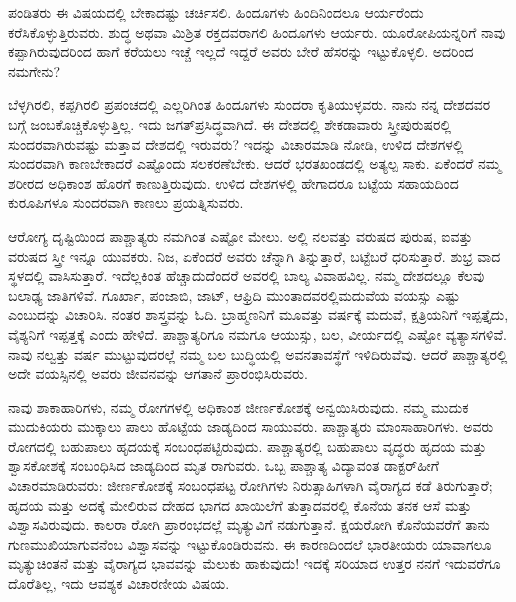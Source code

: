 ಪಂಡಿತರು ಈ ವಿಷಯದಲ್ಲಿ ಬೇಕಾದಷ್ಟು ಚರ್ಚಿಸಲಿ. ಹಿಂದೂಗಳು ಹಿಂದಿನಿಂದಲೂ ಆರ್ಯರೆಂದು ಕರೆಸಿಕೊಳ್ಳುತ್ತಿರುವರು. ಶುದ್ಧ ಅಥವಾ ಮಿಶ್ರಿತ ರಕ್ತದವರಾಗಲಿ ಹಿಂದೂಗಳು ಆರ್ಯರು. ಯೂರೋಪಿಯನ್ನರಿಗೆ ನಾವು ಕಪ್ಪಾಗಿರುವುದರಿಂದ ಹಾಗೆ ಕರೆಯಲು ಇಚ್ಚೆ ಇಲ್ಲದೆ ಇದ್ದರೆ ಅವರು ಬೇರೆ ಹೆಸರನ್ನು ಇಟ್ಟುಕೊಳ್ಳಲಿ. ಅದರಿಂದ ನಮಗೇನು?

ಬೆಳ್ಳಗಿರಲಿ, ಕಪ್ಪಗಿರಲಿ ಪ್ರಪಂಚದಲ್ಲಿ ಎಲ್ಲರಿಗಿಂತ ಹಿಂದೂಗಳು ಸುಂದರಾ ಕೃತಿಯುಳ್ಳ\break ವರು. ನಾನು ನನ್ನ ದೇಶದವರ ಬಗ್ಗೆ ಜಂಬಕೊಚ್ಚಿಕೊಳ್ಳುತ್ತಿಲ್ಲ. ಇದು ಜಗತ್​ಪ್ರಸಿದ್ಧವಾಗಿದೆ. ಈ ದೇಶದಲ್ಲಿ ಶೇಕಡಾವಾರು ಸ್ತ್ರೀಪುರುಷರಲ್ಲಿ ಸುಂದರವಾಗಿರುವಷ್ಟು ಮತ್ತಾವ ದೇಶದಲ್ಲಿ ಇರುವರು? ಇದನ್ನು ವಿಚಾರಮಾಡಿ ನೋಡಿ, ಉಳಿದ ದೇಶಗಳಲ್ಲಿ ಸುಂದರವಾಗಿ ಕಾಣಬೇಕಾದರೆ ಎಷ್ಟೊಂದು ಸಲಕರಣೆಬೇಕು. ಆದರೆ ಭರತಖಂಡದಲ್ಲಿ ಅತ್ಯಲ್ಪ ಸಾಕು. ಏಕೆಂದರೆ ನಮ್ಮ ಶರೀರದ ಅಧಿಕಾಂಶ ಹೊರಗೆ ಕಾಣುತ್ತಿರುವುದು. ಉಳಿದ ದೇಶಗಳಲ್ಲಿ ಹೇಗಾದರೂ ಬಟ್ಟೆಯ ಸಹಾಯದಿಂದ ಕುರೂಪಿಗಳೂ ಸುಂದರವಾಗಿ ಕಾಣಲು ಪ್ರಯತ್ನಿಸುವರು.

ಆರೋಗ್ಯ ದೃಷ್ಟಿಯಿಂದ ಪಾಶ್ಚಾತ್ಯರು ನಮಗಿಂತ ಎಷ್ಟೋ ಮೇಲು. ಅಲ್ಲಿ ನಲವತ್ತು ವರುಷದ ಪುರುಷ, ಐವತ್ತು ವರುಷದ ಸ್ತ್ರೀ ಇನ್ನೂ ಯುವಕರು. ನಿಜ, ಏಕೆಂದರೆ ಅವರು ಚೆನ್ನಾಗಿ ತಿನ್ನುತ್ತಾರೆ, ಬಟ್ಟೆಬರೆ ಧರಿಸುತ್ತಾರೆ. ಶುಭ್ರ ವಾದ ಸ್ಥಳದಲ್ಲಿ ವಾಸಿಸುತ್ತಾರೆ. ಇದೆಲ್ಲಕಿಂತ ಹೆಚ್ಚಾದುದೆಂದರೆ ಅವರಲ್ಲಿ ಬಾಲ್ಯ ವಿವಾಹವಿಲ್ಲ. ನಮ್ಮ ದೇಶದಲ್ಲೂ ಕೆಲವು ಬಲಾಢ್ಯ ಜಾತಿಗಳಿವೆ. ಗೂರ್ಖಾ, ಪಂಜಾಬಿ, ಜಾಟ್​, ಆಫ್ರಿದಿ ಮುಂತಾದವರಲ್ಲಿ\break ಮದುವೆಯ ವಯಸ್ಸು ಎಷ್ಟು ಎಂಬುದನ್ನು ವಿಚಾರಿಸಿ. ನಂತರ ಶಾಸ್ತ್ರವನ್ನು ಓದಿ. ಬ್ರಾಹ್ಮಣನಿಗೆ ಮೂವತ್ತು ವರ್ಷಕ್ಕೆ ಮದುವೆ, ಕ್ಷತ್ರಿಯನಿಗೆ ಇಪ್ಪತ್ತೈದು, ವೈಶ್ಯನಿಗೆ ಇಪ್ಪತ್ತಕ್ಕೆ ಎಂದು ಹೇಳಿದೆ. ಪಾಶ್ಚಾತ್ಯರಿಗೂ ನಮಗೂ ಆಯುಸ್ಸು, ಬಲ, ವೀರ್ಯದಲ್ಲಿ ಎಷ್ಟೋ ವ್ಯತ್ಯಾಸಗಳಿವೆ. ನಾವು ನಲ್ವತ್ತು ವರ್ಷ ಮುಟ್ಟುವುದರಲ್ಲೆ ನಮ್ಮ ಬಲ ಬುದ್ಧಿಯಲ್ಲಿ ಅವನತಾವಸ್ಥೆಗೆ ಇಳಿದಿರುವೆವು. ಆದರೆ ಪಾಶ್ಚಾತ್ಯರಲ್ಲಿ ಅದೇ ವಯಸ್ಸಿನಲ್ಲಿ ಅವರು ಜೀವನವನ್ನು ಆಗತಾನೆ ಪ್ರಾರಂಭಿಸಿರುವರು.

ನಾವು ಶಾಕಾಹಾರಿಗಳು, ನಮ್ಮ ರೋಗಗಳಲ್ಲಿ ಅಧಿಕಾಂಶ ಜೀರ್ಣಕೋಶಕ್ಕೆ ಅನ್ವಯಿಸಿರು\break ವುದು. ನಮ್ಮ ಮುದುಕ ಮುದುಕಿಯರು ಮುಕ್ಕಾಲು ಪಾಲು ಹೊಟ್ಟೆಯ ಜಾಡ್ಯದಿಂದ ಸಾಯುವರು. ಪಾಶ್ಚಾತ್ಯರು ಮಾಂಸಾಹಾರಿಗಳು. ಅವರು ರೋಗದಲ್ಲಿ ಬಹುಪಾಲು ಹೃದಯಕ್ಕೆ ಸಂಬಂಧಪಟ್ಟಿರುವುದು. ಪಾಶ್ಚಾತ್ಯರಲ್ಲಿ ಬಹುಪಾಲು ವೃದ್ಧರು ಹೃದಯ ಮತ್ತು ಶ್ವಾಸಕೋಶಕ್ಕೆ ಸಂಬಂಧಿಸಿದ ಜಾಡ್ಯದಿಂದ ಮೃತ ರಾಗುವರು. ಒಬ್ಬ ಪಾಶ್ಚಾತ್ಯ ವಿದ್ಯಾವಂತ ಡಾಕ್ಟರ್​ ಹೀಗೆ ವಿಚಾರಮಾಡಿರುವರು: ಜೀರ್ಣಕೋಶಕ್ಕೆ ಸಂಬಂಧಪಟ್ಟ ರೋಗಿಗಳು ನಿರುತ್ಸಾಹಿಗಳಾಗಿ ವೈರಾಗ್ಯದ ಕಡೆ ತಿರುಗುತ್ತಾರೆ; ಹೃದಯ ಮತ್ತು ಅದಕ್ಕೆ ಮೇಲಿರುವ ದೇಹದ ಭಾಗದ ಖಾಯಿಲೆಗೆ ತುತ್ತಾದವರಲ್ಲಿ ಕೊನೆಯ ತನಕ ಆಸೆ ಮತ್ತು ವಿಶ್ವಾಸವಿರುವುದು. ಕಾಲರಾ ರೋಗಿ ಪ್ರಾರಂಭದಲ್ಲೆ ಮೃತ್ಯುವಿಗೆ ನಡುಗುತ್ತಾನೆ. ಕ್ಷಯರೋಗಿ ಕೊನೆಯವರೆಗೆ ತಾನು ಗುಣಮುಖಿಯಾಗುವನೆಂಬ ವಿಶ್ವಾಸವನ್ನು ಇಟ್ಟುಕೊಂಡಿರುವನು. ಈ ಕಾರಣದಿಂದಲೆ ಭಾರತೀಯರು ಯಾವಾಗಲೂ ಮೃತ್ಯುಚಿಂತನೆ ಮತ್ತು ವೈರಾಗ್ಯದ ಭಾವವನ್ನು ಮೆಲುಕು ಹಾಕುವುದು! ಇದಕ್ಕೆ ಸರಿಯಾದ ಉತ್ತರ ನನಗೆ ಇದುವರೆಗೂ ದೊರೆತಿಲ್ಲ, ಇದು ಆವಶ್ಯಕ ವಿಚಾರಣೀಯ ವಿಷಯ.

